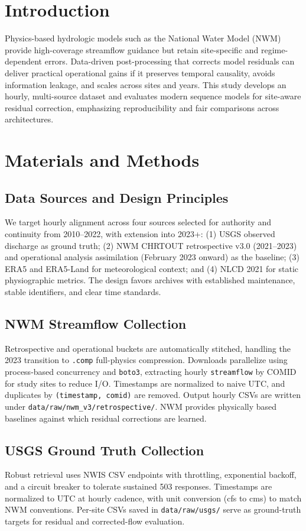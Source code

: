 \documentclass[draft]{agujournal2019}
\begin{document}
\section{Introduction}
Physics-based hydrologic models such as the National Water Model (NWM) provide high-coverage streamflow guidance but retain site-specific and regime-dependent errors. Data-driven post-processing that corrects model residuals can deliver practical operational gains if it preserves temporal causality, avoids information leakage, and scales across sites and years. This study develops an hourly, multi-source dataset and evaluates modern sequence models for site-aware residual correction, emphasizing reproducibility and fair comparisons across architectures.

\section{Materials and Methods}
\subsection{Data Sources and Design Principles}
We target hourly alignment across four sources selected for authority and continuity from 2010--2022, with extension into 2023+: (1) USGS observed discharge as ground truth; (2) NWM CHRTOUT retrospective v3.0 (2021--2023) and operational analysis assimilation (February 2023 onward) as the baseline; (3) ERA5 and ERA5-Land for meteorological context; and (4) NLCD 2021 for static physiographic metrics. The design favors archives with established maintenance, stable identifiers, and clear time standards.

\subsection{NWM Streamflow Collection}
Retrospective and operational buckets are automatically stitched, handling the 2023 transition to \texttt{.comp} full-physics compression. Downloads parallelize using process-based concurrency and \texttt{boto3}, extracting hourly \texttt{streamflow} by COMID for study sites to reduce I/O. Timestamps are normalized to naive UTC, and duplicates by \texttt{(timestamp, comid)} are removed. Output hourly CSVs are written under \texttt{data/raw/nwm\_v3/retrospective/}. NWM provides physically based baselines against which residual corrections are learned.

\subsection{USGS Ground Truth Collection}
Robust retrieval uses NWIS CSV endpoints with throttling, exponential backoff, and a circuit breaker to tolerate sustained 503 responses. Timestamps are normalized to UTC at hourly cadence, with unit conversion (cfs to cms) to match NWM conventions. Per-site CSVs saved in \texttt{data/raw/usgs/} serve as ground-truth targets for residual and corrected-flow evaluation.
\end{document}
